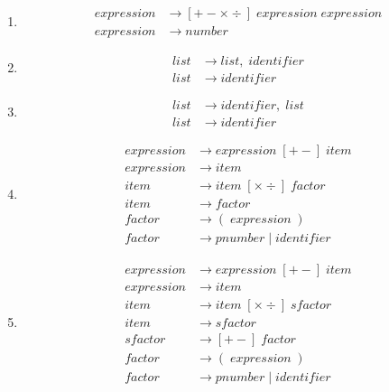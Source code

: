 \documentclass[scheme=plain,12pt]{ctexart}
\begin{document}
    \begin{enumerate}
        \item \begin{align*}
            expression  &\to [+-\times\div]\;expression\;expression \\
            expression  &\to number
        \end{align*}
        \item \begin{align*}
            list        &\to list,\;identifier \\
            list        &\to identifier
        \end{align*}
        \item \begin{align*}
            list        &\to identifier,\;list \\
            list        &\to identifier
        \end{align*}
        \item \begin{align*}
            expression  &\to expression\;[+-]\;item \\
            expression  &\to item \\
            item        &\to item\;[\times\div]\;factor \\
            item        &\to factor \\
            factor      &\to  (\;expression\;) \\
            factor      &\to pnumber\;|\;identifier
        \end{align*}
        \item \begin{align*}
            expression  &\to expression\;[+-]\;item \\
            expression  &\to item \\
            item        &\to item\;[\times\div]\;sfactor \\
            item        &\to sfactor \\
            sfactor     &\to [+-]\;factor \\
            factor      &\to  (\;expression\;) \\
            factor      &\to pnumber\;|\;identifier
        \end{align*}
    \end{enumerate}
\end{document}
